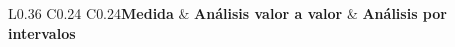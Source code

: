 \begin{TablaDatosFlexible}{L{0.36\linewidth} C{0.24\linewidth} C{0.24\linewidth}}{\textbf{Medida} & \textbf{Análisis valor a valor} & \textbf{Análisis por intervalos}}


\end{TablaDatosFlexible}